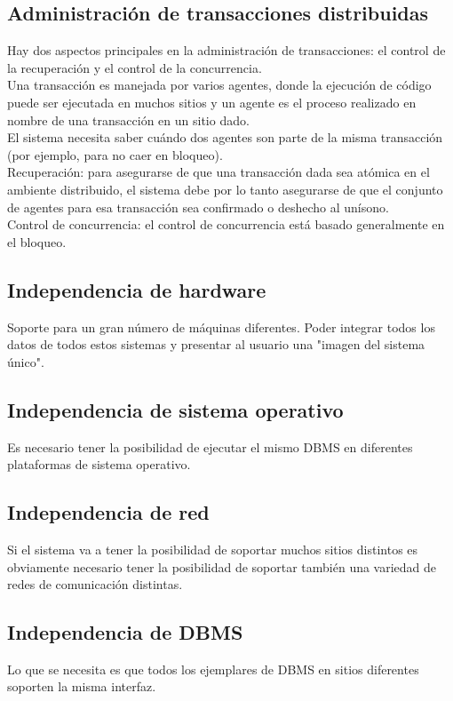 \documentclass[10pt,a4paper,oneside]{article}
\begin{document}
\begin {itemize}
\subsection{Administraci\'on de transacciones distribuidas}
Hay dos aspectos principales en la administraci\'on de transacciones: el control de la recuperaci\'on y el control de la concurrencia. 
\\Una transacci\'on es manejada por varios agentes, donde la ejecuci\'on de c\'odigo puede ser ejecutada en muchos sitios y un agente es el proceso realizado en nombre de una transacci\'on en un sitio dado.
\\El sistema necesita saber cu\'ando dos agentes son parte de la misma transacci\'on (por ejemplo, para no caer en bloqueo).
\\Recuperaci\'on: para asegurarse de que una transacci\'on dada sea at\'omica en el ambiente distribuido, el sistema debe por lo tanto asegurarse de que el conjunto de agentes para esa transacci\'on sea confirmado o deshecho al un\'isono. 
\\Control de concurrencia: el control de concurrencia est\'a basado generalmente en el bloqueo. 

\subsection{Independencia de hardware}
Soporte para un gran n\'umero de m\'aquinas diferentes. Poder integrar todos los datos de todos estos sistemas y presentar al usuario una "imagen del sistema \'unico".
\subsection{Independencia de sistema operativo}
Es necesario tener la posibilidad de ejecutar el mismo DBMS en diferentes plataformas de sistema operativo.
\subsection{Independencia de red}
Si el sistema va a tener la posibilidad de soportar muchos sitios distintos es obviamente necesario tener la posibilidad de soportar tambi\'en una variedad de redes de comunicaci\'on distintas. 
\subsection{Independencia de DBMS}
Lo que se necesita es que todos los ejemplares de DBMS en sitios diferentes soporten la misma interfaz.
\begin{itemize}


\end{itemize}
\end{itemize}
\end{document}
